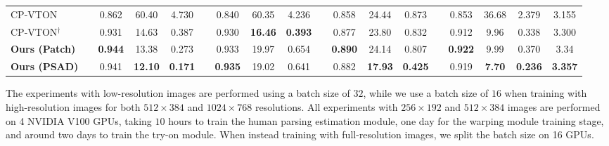 \begin{table*}[t]
{\begin{tabular}{lc ccc c ccc c ccc c cccc}
\midrule
CP-VTON~\cite{wang2018toward} & & 0.862 & 60.40 & 4.730 & & 0.840 & 60.35 & 4.236 & & 0.858 & 24.44 & 0.873 & & 0.853 & 36.68 & 2.379 & 3.155 \\
CP-VTON$^\dagger$~\cite{wang2018toward} & & 0.931 & 14.63 & 0.387 & & 0.930 & \textbf{16.46} & \textbf{0.393} & & 0.877 & 23.80 & 0.832 & & 0.912 & 9.96 & 0.338 & 3.300 \\
\textbf{Ours (Patch)} & & \textbf{0.944} & 13.38 & 0.273 & & 0.933 & 19.97 & 0.654 & & \textbf{0.890} & 24.14 & 0.807 & & \textbf{0.922} & 9.99 & 0.370 & 3.34 \\
\textbf{Ours (PSAD)} & & 0.941 & \textbf{12.10} & \textbf{0.171} & & \textbf{0.935} & 19.02 & 0.641 & & 0.882 & \textbf{17.93} & \textbf{0.425} & & 0.919 & \textbf{7.70} & \textbf{0.236} & \textbf{3.357} \\
\bottomrule
\end{tabular}
}
\vspace{-0.3cm}
\end{table*}

 The experiments with low-resolution images are performed using a batch size of $32$, while we use a batch size of $16$ when training with high-resolution images for both $512\times384$ and $1024\times768$ resolutions. All experiments with $256\times192$ and $512\times384$ images are performed on 4 NVIDIA V100 GPUs, taking $10$ hours to train the human parsing estimation module, one day for the warping module training stage, and around two days to train the try-on module. When instead training with full-resolution images, we split the batch size on 16 GPUs.



